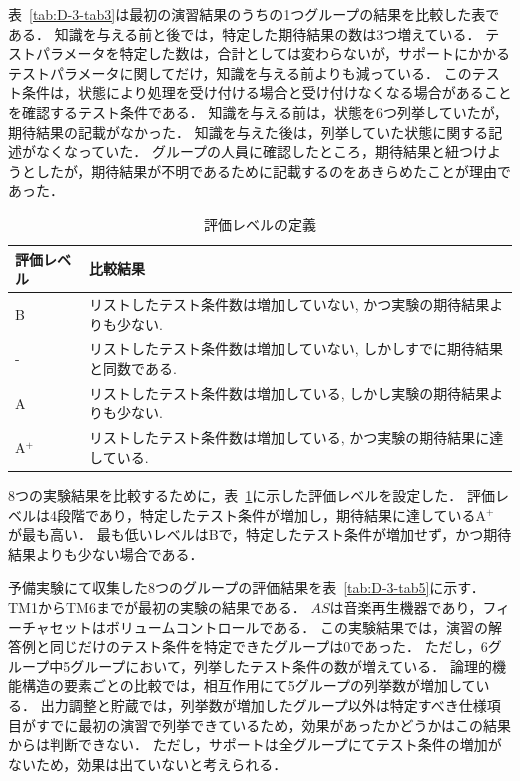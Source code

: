 表~\ref{tab:D-3-tab3}は最初の演習結果のうちの1つグループの結果を比較した表である．
知識を与える前と後では，特定した期待結果の数は3つ増えている．
テストパラメータを特定した数は，合計としては変わらないが，サポートにかかるテストパラメータに関してだけ，知識を与える前よりも減っている．
このテスト条件は，状態により処理を受け付ける場合と受け付けなくなる場合があることを確認するテスト条件である．
知識を与える前は，状態を6つ列挙していたが，期待結果の記載がなかった．
知識を与えた後は，列挙していた状態に関する記述がなくなっていた．
グループの人員に確認したところ，期待結果と紐つけようとしたが，期待結果が不明であるために記載するのをあきらめたことが理由であった．

\begin{table}[htbp]
  \centering
  \caption{評価レベルの定義}
    \begin{tabular}{|l|p{14em}|}
       \hline
    評価レベル & \multicolumn{1}{l|}{比較結果} \\
        \hline
        \hline
     B    & リストしたテスト条件数は増加していない, かつ実験の期待結果よりも少ない.  \\
        \hline
    -     & リストしたテスト条件数は増加していない, しかしすでに期待結果と同数である.  \\
        \hline
    A     & リストしたテスト条件数は増加している, しかし実験の期待結果よりも少ない.   \\
       \hline
    A${}^\text{+}$    & リストしたテスト条件数は増加している, かつ実験の期待結果に達している. \\
        \hline
    \end{tabular}%
  \label{tab:D-3-tab4}%
\end{table}%

8つの実験結果を比較するために，表~\ref{tab:D-3-tab4}に示した評価レベルを設定した．
評価レベルは4段階であり，特定したテスト条件が増加し，期待結果に達しているA${}^\text{+}$ が最も高い．
最も低いレベルはBで，特定したテスト条件が増加せず，かつ期待結果よりも少ない場合である．

予備実験にて収集した8つのグループの評価結果を表~\ref{tab:D-3-tab5}に示す．
TM1からTM6までが最初の実験の結果である．
$AS$は音楽再生機器であり，フィーチャセットはボリュームコントロールである．
この実験結果では，演習の解答例と同じだけのテスト条件を特定できたグループは0であった．
ただし，6グループ中5グループにおいて，列挙したテスト条件の数が増えている．
論理的機能構造の要素ごとの比較では，相互作用にて5グループの列挙数が増加している．
出力調整と貯蔵では，列挙数が増加したグループ以外は特定すべき仕様項目がすでに最初の演習で列挙できているため，効果があったかどうかはこの結果からは判断できない．
ただし，サポートは全グループにてテスト条件の増加がないため，効果は出ていないと考えられる．

